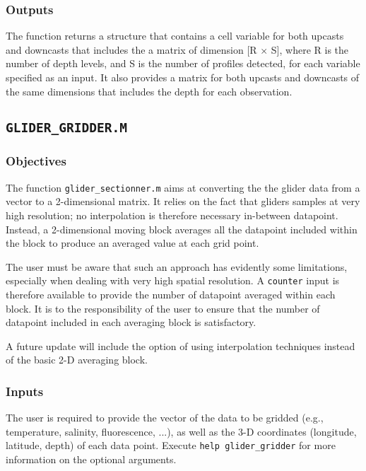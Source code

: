 \documentclass[11pt,A4]{report}
\begin{document}
\subsubsection{Outputs}

The function returns a structure that contains a cell variable for both upcasts and downcasts that includes the a matrix of dimension [R $\times$ S], where R is the number of depth levels, and S is the number of profiles detected, for each variable specified as an input. It also provides a matrix for both upcasts and downcasts of the same dimensions that includes the depth for each observation.

\subsection{\texttt{GLIDER\_GRIDDER.M}}
\subsubsection{Objectives}
The function \texttt{glider\_sectionner.m} aims at converting the the glider data from a vector to a 2-dimensional matrix. It relies on the fact that gliders samples at very high resolution; no interpolation is therefore necessary in-between datapoint. Instead, a 2-dimensional moving block averages all the datapoint included within the block to produce an averaged value at each grid point.

The user must be aware that such an approach has evidently some limitations, especially when dealing with very high spatial resolution. A \texttt{counter} input is therefore available to provide the number of datapoint averaged within each block. It is to the responsibility of the user to ensure that the number of datapoint included in each averaging block is satisfactory.

A future update will include the option of using interpolation techniques instead of the basic 2-D averaging block.

\subsubsection{Inputs}

The user is required to provide the vector of the data to be gridded (e.g., temperature, salinity, fluorescence, ...), as well as the 3-D coordinates (longitude, latitude, depth) of each data point. Execute \texttt{help glider\_gridder} for more information on the optional arguments.
\end{document}
